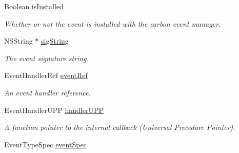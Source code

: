 \begin{DoxyCompactItemize}
\item 
\hypertarget{interface_g_d_carbon_event_a6e9b1a253f2df29a0b15fa278033b7fc}{
Boolean \hyperlink{interface_g_d_carbon_event_a6e9b1a253f2df29a0b15fa278033b7fc}{isInstalled}}
\label{interface_g_d_carbon_event_a6e9b1a253f2df29a0b15fa278033b7fc}

\begin{DoxyCompactList}\small\item\em Whether or not the event is installed with the carbon event manager. \item\end{DoxyCompactList}\item 
\hypertarget{interface_g_d_carbon_event_aaecdb5a2e5158162b9034486f9d81fc5}{
NSString $\ast$ \hyperlink{interface_g_d_carbon_event_aaecdb5a2e5158162b9034486f9d81fc5}{sigString}}
\label{interface_g_d_carbon_event_aaecdb5a2e5158162b9034486f9d81fc5}

\begin{DoxyCompactList}\small\item\em The event signature string. \item\end{DoxyCompactList}\item 
\hypertarget{interface_g_d_carbon_event_af21ea340387a4216427700e68575c897}{
EventHandlerRef \hyperlink{interface_g_d_carbon_event_af21ea340387a4216427700e68575c897}{eventRef}}
\label{interface_g_d_carbon_event_af21ea340387a4216427700e68575c897}

\begin{DoxyCompactList}\small\item\em An event handler reference. \item\end{DoxyCompactList}\item 
\hypertarget{interface_g_d_carbon_event_a61a5c0e615568c3f8b6982ed66b6bc32}{
EventHandlerUPP \hyperlink{interface_g_d_carbon_event_a61a5c0e615568c3f8b6982ed66b6bc32}{handlerUPP}}
\label{interface_g_d_carbon_event_a61a5c0e615568c3f8b6982ed66b6bc32}

\begin{DoxyCompactList}\small\item\em A function pointer to the internal callback (Universal Precedure Pointer). \item\end{DoxyCompactList}\item 
\hypertarget{interface_g_d_carbon_event_a5e43acd8e1c5dcc539edadf461425191}{
EventTypeSpec \hyperlink{interface_g_d_carbon_event_a5e43acd8e1c5dcc539edadf461425191}{eventSpec}}
\label{interface_g_d_carbon_event_a5e43acd8e1c5dcc539edadf461425191}


\end{DoxyCompactItemize}
